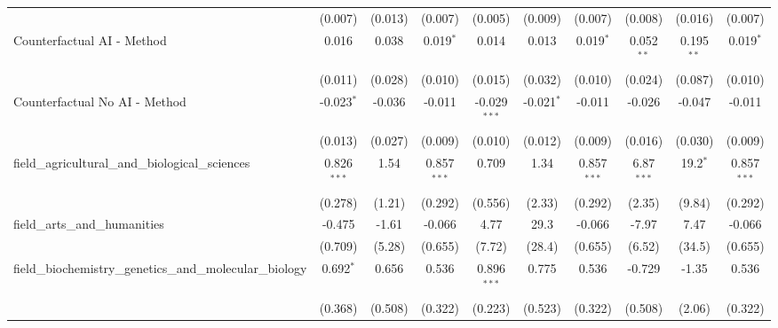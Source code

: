 \begin{tabular}{lccccccccc}
                                                               & (0.007)        & (0.013)        & (0.007)        & (0.005)        & (0.009)        & (0.007)        & (0.008)        & (0.016)        & (0.007)\\   
   Counterfactual AI - Method                                  & 0.016          & 0.038          & 0.019$^{*}$    & 0.014          & 0.013          & 0.019$^{*}$    & 0.052$^{**}$   & 0.195$^{**}$   & 0.019$^{*}$\\   
                                                               & (0.011)        & (0.028)        & (0.010)        & (0.015)        & (0.032)        & (0.010)        & (0.024)        & (0.087)        & (0.010)\\   
   Counterfactual No AI - Method                               & -0.023$^{*}$   & -0.036         & -0.011         & -0.029$^{***}$ & -0.021$^{*}$   & -0.011         & -0.026         & -0.047         & -0.011\\   
                                                               & (0.013)        & (0.027)        & (0.009)        & (0.010)        & (0.012)        & (0.009)        & (0.016)        & (0.030)        & (0.009)\\   
   field\_agricultural\_and\_biological\_sciences              & 0.826$^{***}$  & 1.54           & 0.857$^{***}$  & 0.709          & 1.34           & 0.857$^{***}$  & 6.87$^{***}$   & 19.2$^{*}$     & 0.857$^{***}$\\   
                                                               & (0.278)        & (1.21)         & (0.292)        & (0.556)        & (2.33)         & (0.292)        & (2.35)         & (9.84)         & (0.292)\\   
   field\_arts\_and\_humanities                                & -0.475         & -1.61          & -0.066         & 4.77           & 29.3           & -0.066         & -7.97          & 7.47           & -0.066\\   
                                                               & (0.709)        & (5.28)         & (0.655)        & (7.72)         & (28.4)         & (0.655)        & (6.52)         & (34.5)         & (0.655)\\   
   field\_biochemistry\_genetics\_and\_molecular\_biology      & 0.692$^{*}$    & 0.656          & 0.536          & 0.896$^{***}$  & 0.775          & 0.536          & -0.729         & -1.35          & 0.536\\   
                                                               & (0.368)        & (0.508)        & (0.322)        & (0.223)        & (0.523)        & (0.322)        & (0.508)        & (2.06)         & (0.322)\\   

\end{tabular}
